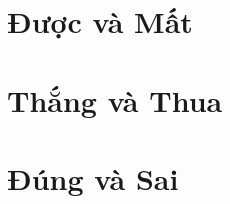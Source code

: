 \documentclass[14pt,a4paper,twoside]{extbook}
\begin{document}



\frontmatter
\tableofcontents
\clearpage


\mainmatter

\part{Được và Mất}








\part{Thắng và Thua}








\part{Đúng và Sai}







\backmatter

\end{document}
